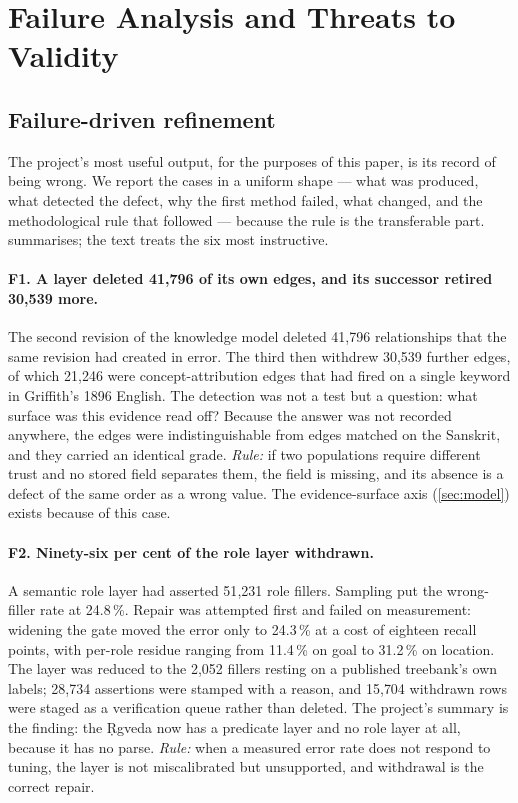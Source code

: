 \section{Failure Analysis and Threats to Validity}
\label{sec:failure}

\subsection{Failure-driven refinement}

The project's most useful output, for the purposes of this paper, is its record of
being wrong. We report the cases in a uniform shape --- what was produced, what
detected the defect, why the first method failed, what changed, and the
methodological rule that followed --- because the rule is the transferable part.
 summarises; the text treats the six most instructive.



\paragraph{F1. A layer deleted 41{,}796 of its own edges, and its successor retired
30{,}539 more.} The second revision of the knowledge model deleted 41{,}796
relationships that the same revision had created in error. The third then withdrew
30{,}539 further edges, of which 21{,}246 were concept-attribution edges that had
fired on a single keyword in Griffith's 1896 English. The detection was not a test
but a question: what surface was this evidence read off? Because the answer was not
recorded anywhere, the edges were indistinguishable from edges matched on the
Sanskrit, and they carried an identical grade. \emph{Rule:} if two populations
require different trust and no stored field separates them, the field is missing,
and its absence is a defect of the same order as a wrong value. The evidence-surface
axis (\cref{sec:model}) exists because of this case.

\paragraph{F2. Ninety-six per cent of the role layer withdrawn.} A semantic role
layer had asserted 51{,}231 role fillers. Sampling put the wrong-filler rate at
24.8\,\%. Repair was attempted first and failed on measurement: widening the gate
moved the error only to 24.3\,\% at a cost of eighteen recall points, with per-role
residue ranging from 11.4\,\% on goal to 31.2\,\% on location. The layer was reduced
to the 2{,}052 fillers resting on a published treebank's own labels; 28{,}734
assertions were stamped  with a reason, and 15{,}704 withdrawn
rows were staged as a verification queue rather than deleted. The project's summary
is the finding: the \d{R}gveda now has a predicate layer and no role layer at all,
because it has no parse. \emph{Rule:} when a measured error rate does not respond to
tuning, the layer is not miscalibrated but unsupported, and withdrawal is the correct
repair.

